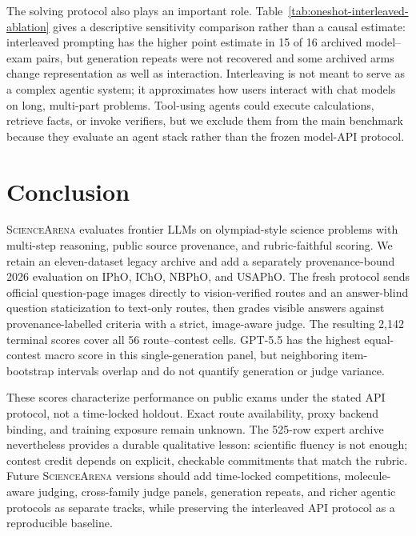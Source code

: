 \documentclass[11pt]{article}
\begin{document}
The solving protocol also plays an important role. Table~\ref{tab:oneshot-interleaved-ablation} gives a descriptive sensitivity comparison rather than a causal estimate: interleaved prompting has the higher point estimate in 15 of 16 archived model--exam pairs, but generation repeats were not recovered and some archived arms change representation as well as interaction. Interleaving is not meant to serve as a complex agentic system; it approximates how users interact with chat models on long, multi-part problems. Tool-using agents could execute calculations, retrieve facts, or invoke verifiers, but we exclude them from the main benchmark because they evaluate an agent stack rather than the frozen model-API protocol.




\section{Conclusion}
\textsc{ScienceArena} evaluates frontier LLMs on olympiad-style science problems with multi-step reasoning, public source provenance, and rubric-faithful scoring.
We retain an eleven-dataset legacy archive and add a separately provenance-bound 2026 evaluation on IPhO, IChO, NBPhO, and USAPhO.
The fresh protocol sends official question-page images directly to vision-verified routes and an answer-blind question staticization to text-only routes, then grades visible answers against provenance-labelled criteria with a strict, image-aware judge.
The resulting 2,142 terminal scores cover all 56 route--contest cells. GPT-5.5 has the highest equal-contest macro score in this single-generation panel, but neighboring item-bootstrap intervals overlap and do not quantify generation or judge variance.

These scores characterize performance on public exams under the stated API protocol, not a time-locked holdout. Exact route availability, proxy backend binding, and training exposure remain unknown. The 525-row expert archive nevertheless provides a durable qualitative lesson: scientific fluency is not enough; contest credit depends on explicit, checkable commitments that match the rubric.
Future \textsc{ScienceArena} versions should add time-locked competitions, molecule-aware judging, cross-family judge panels, generation repeats, and richer agentic protocols as separate tracks, while preserving the interleaved API protocol as a reproducible baseline.
\end{document}
